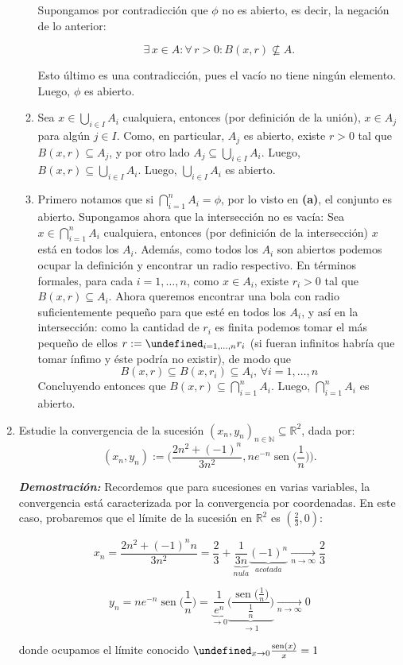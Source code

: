 \documentclass[letterpaper]{article}
\DeclareMathOperator{\sen}{sen}
\let\lim=\undefined\DeclareMathOperator*{\lim}{\text{lím}}
\let\min=\undefined\DeclareMathOperator*{\min}{\text{mín}}
\newcommand{\N}{\mathbb{N}}
\newcommand{\R}{\mathbb{R}}
\newcommand{\dem}{\textbf{\emph{Demostraci\'on: }}}
\begin{document}
\begin{enumerate}
\begin{enumerate}
    Supongamos por contradicción que $\phi$ no es abierto, es decir, la negación de lo anterior:
    
    \[\exists\, x\in A : \forall\, r>0 : B(x,r)\nsubseteq A.\]
    
    Esto último es una contradicción, pues el vacío no tiene ningún elemento. Luego, $\phi$ es abierto.
    
    
    
    \item Sea $x\in \bigcup_{i\in I}A_i$ cualquiera, entonces (por definición de la unión), $x\in A_j$ para algún $j\in I$. Como, en particular, $A_j$ es abierto, existe $r>0$ tal que $B(x,r)\subseteq A_j$, y por otro lado $A_j\subseteq \bigcup_{i\in I}A_i$. Luego, $B(x,r)\subseteq \bigcup_{i\in I}A_i$. Luego, $\bigcup_{i\in I}A_i$ es abierto.
    
    \item Primero notamos que si $\bigcap_{i=1}^nA_i=\phi$, por lo visto en \textbf{(a)}, el conjunto es abierto. Supongamos ahora que la intersección no es vacía: Sea $x\in \bigcap_{i=1}^nA_i$ cualquiera, entonces (por definición de la intersección) $x$ está en todos los $A_i$. Además, como todos los $A_i$ son abiertos podemos ocupar la definición y encontrar un radio respectivo. En términos formales, para cada $i=1,\ldots,n$, como $x\in A_i$, existe $r_i>0$ tal que $B(x,r)\subseteq A_i$. Ahora queremos encontrar una bola con radio suficientemente pequeño para que esté en todos los $A_i$, y así en la intersección: como la cantidad de $r_i$ es finita podemos tomar el más pequeño de ellos $r:=\min_{i=1,\ldots,n}r_i$ (si fueran infinitos habría que tomar ínfimo y éste podría no existir), de modo que
    \[B(x,r)\subseteq B(x,r_i)\subseteq A_i,\,\forall i=1,\ldots,n\]
    Concluyendo entonces que $B(x,r)\subseteq \bigcap_{i=1}^nA_i$. Luego, $\bigcap_{i=1}^nA_i$ es abierto.
\end{enumerate}


\item Estudie la convergencia de la sucesión $(x_n,y_n)_{n\in\N}\subseteq \R^2$, dada por:
\[(x_n,y_n):=\bigg(\frac{2n^2+(-1)^n}{3n^2},ne^{-n}\sen\bigg(\frac{1}{n}\bigg)\bigg).\]

\dem Recordemos que para sucesiones en varias variables, la convergencia está caracterizada por la convergencia por coordenadas. En este caso, probaremos que el límite de la sucesión en $\R^2$ es $(\frac{2}{3},0)$:

\[x_n=\frac{2n^2+(-1)^nn}{3n^2}=\frac{2}{3}+\underbrace{\frac{1}{3n}}_{nula}\underbrace{(-1)^n}_{acotada}\xrightarrow[n\to\infty]{}\frac{2}{3}\]

\[y_n=ne^{-n}\sen\Big(\frac{1}{n}\Big)=\underbrace{\frac{1}{e^n}}_{\to 0}\underbrace{\bigg(\frac{\sen\big(\frac{1}{n}\big)}{\frac{1}{n}}\bigg)}_{\to 1}\xrightarrow[n\to\infty]{}0\]

donde ocupamos el límite conocido $\lim_{x\to0}\frac{\sen(x)}{x}=1$




\end{enumerate}	
\end{document}

